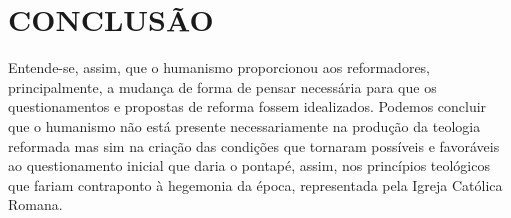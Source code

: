 \documentclass[
    article,            %
	12pt,				%
	oneside,			%
	a4paper,			%
	chapter=TITLE,		%
	section=TITLE,		%
	english,			%
	french,				%
	spanish,			%
	brazil				%
	]{abntex2}
\begin{document}
\section{CONCLUSÃO}
Entende-se, assim, que o humanismo proporcionou aos reformadores, principalmente, a mudança de forma de pensar necessária para que os questionamentos e propostas de reforma fossem idealizados. Podemos concluir que o humanismo não está presente necessariamente na produção da teologia reformada mas sim na criação das condições que tornaram possíveis e favoráveis ao questionamento inicial que daria o pontapé, assim, nos princípios teológicos que fariam contraponto à hegemonia da época, representada pela Igreja Católica Romana.
\clearpage

\pagebreak
\renewcommand{\bibname}{{REFER\^ENCIAS}}

\end{document}
